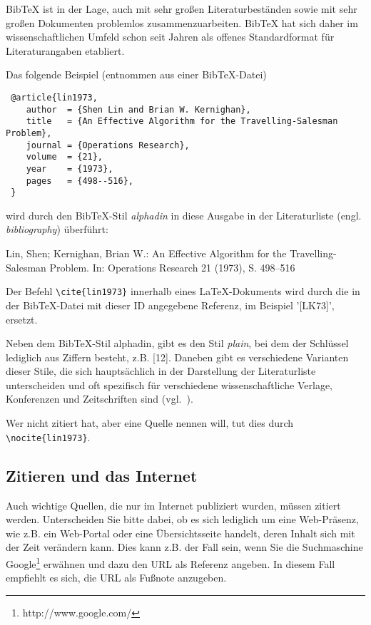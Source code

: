 BibTeX ist in der Lage, auch mit sehr großen Literaturbeständen sowie mit sehr großen Dokumenten problemlos zusammenzuarbeiten. BibTeX hat sich daher im wissenschaftlichen Umfeld schon seit Jahren als offenes Standardformat für Literaturangaben etabliert.

Das folgende Beispiel (entnommen aus einer BibTeX-Datei)

\begin{verbatim}
 @article{lin1973,
    author  = {Shen Lin and Brian W. Kernighan},
    title   = {An Effective Algorithm for the Travelling-Salesman Problem},
    journal = {Operations Research},
    volume  = {21},
    year    = {1973},
    pages   = {498--516},
 }
\end{verbatim}

wird durch den BibTeX-Stil {\em alphadin} in diese Ausgabe in der Literaturliste (engl. {\em bibliography}) überführt:

\medskip
[LK73] Lin, Shen; Kernighan, Brian W.: An Effective Algorithm for the Travelling-Salesman Problem. In: Operations Research 21 (1973), S. 498--516
\medskip

Der Befehl \verb+\cite{lin1973}+ innerhalb eines LaTeX-Dokuments wird durch die in der BibTeX-Datei mit dieser ID angegebene Referenz, im Beispiel '[LK73]', ersetzt.

Neben dem BibTeX-Stil alphadin, gibt es den Stil {\em plain}, bei dem der Schlüssel lediglich aus Ziffern besteht, z.B. [12]. Daneben gibt es verschiedene Varianten dieser Stile, die sich hauptsächlich in der Darstellung der Literaturliste unterscheiden und oft spezifisch für verschiedene wissenschaftliche Verlage, Konferenzen und Zeitschriften sind (vgl.~\cite{bibstyle}).

Wer nicht zitiert hat, aber eine Quelle nennen will, tut dies durch \verb+\nocite{lin1973}+.

\nocite{lin1973}

\nocite{*} %

\subsection{Zitieren und das Internet}
Auch wichtige Quellen, die nur im Internet publiziert wurden, müssen zitiert werden.
Unterscheiden Sie bitte dabei, ob es sich lediglich um eine Web-Präsenz, wie z.B. ein Web-Portal oder eine Übersichtsseite handelt, deren Inhalt sich mit der Zeit verändern kann. 
Dies kann z.B. der Fall sein, wenn Sie die Suchmaschine Google\footnote{http://www.google.com/} erwähnen und dazu den URL als Referenz angeben.
In diesem Fall empfiehlt es sich, die URL als Fußnote anzugeben.

